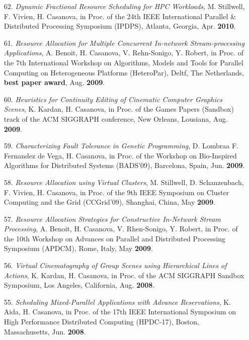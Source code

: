 \begin{enumerate}
\item[62.] {\it Dynamic Fractional Resource Scheduling for HPC
Workloads}, M. Stillwell, F. Vivien, H. Casanova, in Proc. of the
24th  IEEE International Parallel \& Distributed Processing Symposium (IPDPS),
Atlanta, Georgia, Apr. {\bf 2010}.

\item[61.] {\it Resource Allocation for Multiple Concurrent In-network Stream-processing Applications}, A. Benoit, H. Casanova, V. Rehn-Sonigo, Y. Robert,
in Proc. of the 7th International Workshop on Algorithms,
Models and Tools for Parallel Computing on Heterogeneous Platforms 
(HeteroPar), Deltf, The Netherlands, {\bf best paper award},
Aug. {\bf 2009}. 

\item[60.] {\it Heuristics for Continuity Editing of Cinematic Computer
Graphics Scenes}, K. Kardan, H. Casanova, in Proc. of the Games
Papers (Sandbox) track of the ACM SIGGRAPH conference, New Orleans,
Lousiana, Aug. {\bf 2009}.

\item[59.] {\it Characterizing Fault Tolerance in Genetic Programming},
D. Lombraa F. Fernandez de Vega, H. Casanova, in Proc. of the
Workshop on Bio-Inspired Algorithms for Distributed Systems (BADS'09),
Barcelona, Spain, Jun. {\bf 2009}. 

\item[58.] {\it Resource Allocation using Virtual Clusters}, M. Stillwell,
D. Schanzenbach, F. Vivien, H. Casanova, in Proc. of the 9th IEEE
Symposium on Cluster Computing and the Grid (CCGrid'09), Shanghai, China,
May {\bf 2009}.

\item[57.] {\it  Resource Allocation Strategies for Constructive In-Network
Stream Processing}, A. Benoit, H. Casanova, V. Rhen-Sonigo, Y. Robert, in
Proc. of the 10th Workshop on Advances on Parallel and Distributed
Processing Symposium (APDCM), Rome, Italy, May {\bf 2009}.

\item[56.] {\it Virtual Cinematography of Group Scenes using Hierarchical Lines
of Actions}, K. Kardan, H. Casanova, in Proc. of the ACM SIGGRAPH Sandbox
Symposium, Los Angeles, California, Aug. {\bf 2008}.

\item[55.] {\it Scheduling Mixed-Parallel Applications with Advance
Reservations}, K. Aida, H. Casanova, in Proc. of the 17th IEEE
International Symposium on High Performance Distributed Computing
(HPDC-17), Boston, Massachusetts, Jun. {\bf 2008}.


\end{enumerate}
